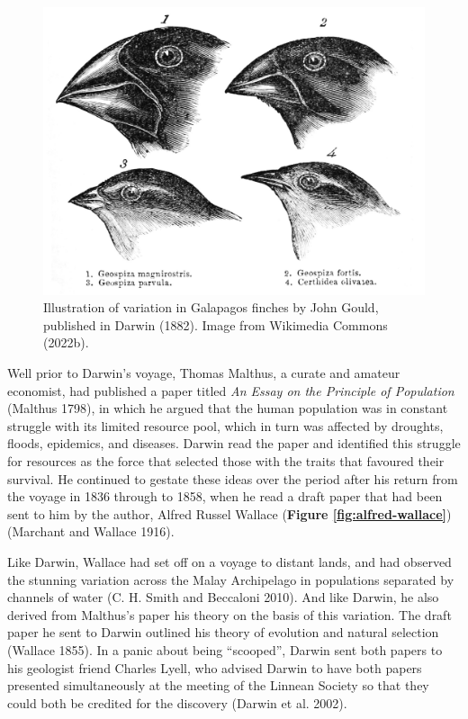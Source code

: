 \documentclass[
]{book}
\begin{document}
\begin{figure}

{\centering \includegraphics[width=1\linewidth]{figs/introduction/Darwin's_finches_by_Gould} 

}

\caption{Illustration of variation in Galapagos finches by John Gould, published in Darwin (1882). Image from Wikimedia Commons (2022b).}\label{fig:darwin-finches}
\end{figure}

Well prior to Darwin's voyage, Thomas Malthus, a curate and amateur economist, had published a paper titled \emph{An Essay on the Principle of Population} (Malthus 1798), in which he argued that the human population was in constant struggle with its limited resource pool, which in turn was affected by droughts, floods, epidemics, and diseases. Darwin read the paper and identified this struggle for resources as the force that selected those with the traits that favoured their survival. He continued to gestate these ideas over the period after his return from the voyage in 1836 through to 1858, when he read a draft paper that had been sent to him by the author, Alfred Russel Wallace (\textbf{Figure \ref{fig:alfred-wallace}}) (Marchant and Wallace 1916).

Like Darwin, Wallace had set off on a voyage to distant lands, and had observed the stunning variation across the Malay Archipelago in populations separated by channels of water (C. H. Smith and Beccaloni 2010). And like Darwin, he also derived from Malthus's paper his theory on the basis of this variation. The draft paper he sent to Darwin outlined his theory of evolution and natural selection (Wallace 1855). In a panic about being ``scooped'', Darwin sent both papers to his geologist friend Charles Lyell, who advised Darwin to have both papers presented simultaneously at the meeting of the Linnean Society so that they could both be credited for the discovery (Darwin et al. 2002).
\end{document}
